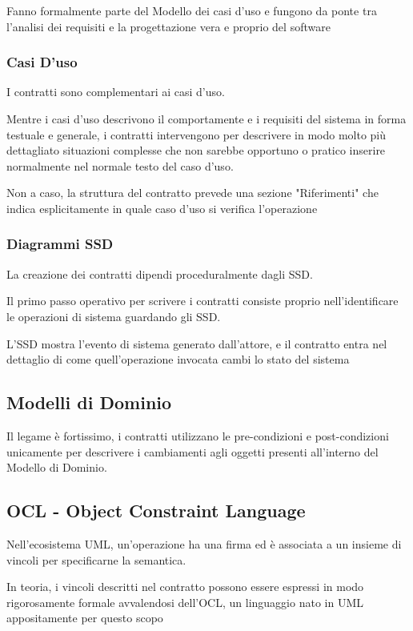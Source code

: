 \vspace{\baselineskip}

Fanno formalmente parte del Modello dei casi d'uso e fungono da ponte tra l'analisi dei requisiti e la progettazione vera e proprio del software 

\subsubsection{Casi D'uso}
I contratti sono complementari ai casi d'uso.

\vspace{\baselineskip}
Mentre i casi d'uso descrivono il comportamente e i requisiti del sistema in forma testuale e generale, i contratti intervengono per descrivere in modo molto più dettagliato situazioni complesse che non sarebbe opportuno o pratico inserire normalmente nel normale testo del caso d'uso.

Non a caso, la struttura del contratto prevede una sezione "Riferimenti" che indica esplicitamente in quale caso d'uso si verifica l'operazione

\subsubsection{Diagrammi SSD}
La creazione dei contratti dipendi proceduralmente dagli SSD.

\vspace{\baselineskip}

Il primo passo operativo per scrivere i contratti consiste proprio nell'identificare le operazioni di sistema guardando gli SSD.

L'SSD mostra l'evento di sistema generato dall'attore, e il contratto entra nel dettaglio di come quell'operazione invocata cambi lo stato del sistema

\subsection{Modelli di Dominio}
Il legame è fortissimo, i contratti utilizzano le pre-condizioni e post-condizioni unicamente per descrivere i cambiamenti agli oggetti presenti all'interno del Modello di Dominio.

\subsection{OCL - Object Constraint Language}
Nell'ecosistema UML, un'operazione ha una firma ed è associata a un insieme di vincoli per specificarne la semantica.

In teoria, i vincoli descritti nel contratto possono essere espressi in modo rigorosamente formale avvalendosi dell'OCL, un linguaggio nato in UML appositamente per questo scopo